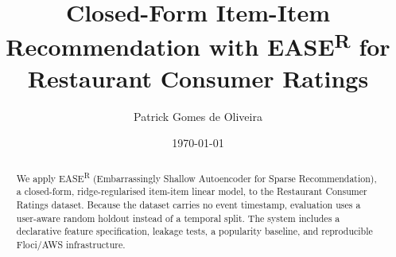 \documentclass[10pt,twocolumn]{article}
\title{Closed-Form Item-Item Recommendation with EASE\textsuperscript{R} for Restaurant Consumer Ratings}
\author{Patrick Gomes de Oliveira}
\date{\today}
\begin{document}
\maketitle
\begin{abstract}
We apply EASE\textsuperscript{R} (Embarrassingly Shallow Autoencoder for
Sparse Recommendation), a closed-form, ridge-regularised item-item linear
model, to the Restaurant Consumer Ratings dataset. Because the dataset
carries no event timestamp, evaluation uses a user-aware random holdout
instead of a temporal split. The system includes a declarative feature
specification, leakage tests, a popularity baseline, and reproducible
Floci/AWS infrastructure.
\end{abstract}









\end{document}
